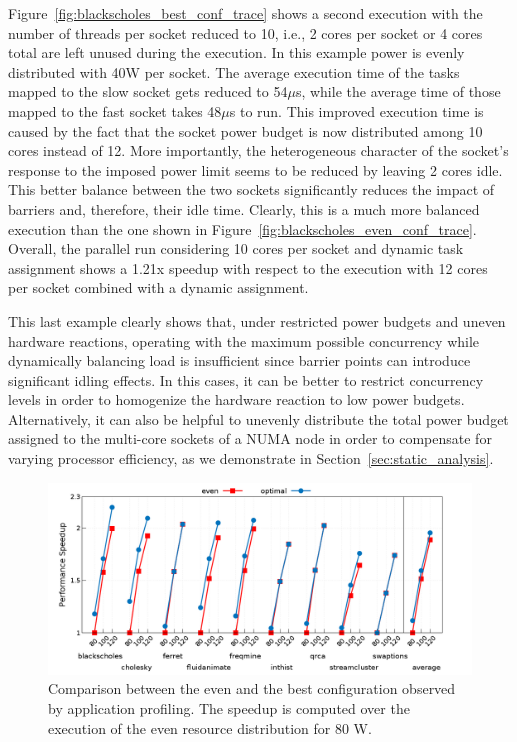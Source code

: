 Figure~\ref{fig:blackscholes_best_conf_trace} shows a second execution with the number of
threads per socket reduced to 10, i.e., 2 cores per socket or 4 cores total are left
unused during the execution.  In this example power is evenly distributed with 40W per
socket.  The average execution time of the tasks mapped to the slow socket gets reduced to
54$\mu$s, while the average time of those mapped to the fast socket takes 48$\mu$s to run.
This improved execution time is caused by the fact that the socket power budget is now
distributed among 10 cores instead of 12.  More importantly, the heterogeneous character
of the socket's response to the imposed power limit seems to be reduced by leaving 2 cores
idle.  This better balance between the two sockets significantly reduces the impact of
barriers and, therefore, their idle time.  Clearly, this is a much more balanced execution
than the one shown in Figure~\ref{fig:blackscholes_even_conf_trace}.  Overall, the
parallel run considering 10 cores per socket and dynamic task assignment shows a 1.21x
speedup with respect to the execution with 12 cores per socket combined with a dynamic
assignment.

This last example clearly shows that, under restricted power budgets and uneven hardware
reactions, operating with the maximum possible concurrency while dynamically balancing
load is insufficient since barrier points can introduce significant idling effects.  In
this cases, it can be better to restrict concurrency levels in order to homogenize the
hardware reaction to low power budgets.  Alternatively, it can also be helpful to unevenly
distribute the total power budget assigned to the multi-core sockets of a NUMA node in
order to compensate for varying processor efficiency, as we demonstrate in
Section~\ref{sec:static_analysis}.

\begin{figure}[ht]
        \centering
        \includegraphics[width=\columnwidth]{./power_aware_runtime/figures/static_conf_analysis}
        \caption{Comparison between the even and the best configuration observed by application profiling. The speedup is computed over the execution of the even resource distribution for 80 W.}
        \label{fig:static_conf_analysis}
\vspace{.5cm}
\end{figure}



